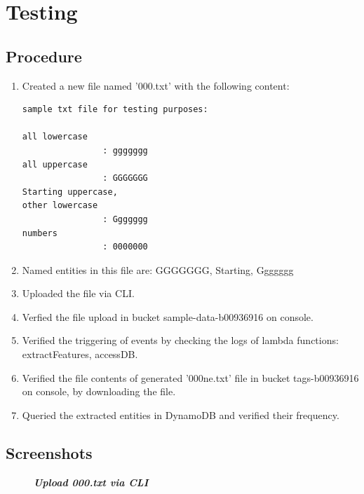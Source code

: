 \newpage
\section{Testing}
\subsection{Procedure}
\begin{enumerate}
    \item Created a new file named '000.txt' with the following content:
  \begin{mdframed}[linewidth=1pt]
\begin{verbatim}
sample txt file for testing purposes:

all lowercase   
                : ggggggg
all uppercase   
                : GGGGGGG
Starting uppercase, 
other lowercase 
                : Ggggggg
numbers         
                : 0000000
\end{verbatim}
\end{mdframed}

    \item Named entities in this file are: GGGGGGG, Starting, Ggggggg
    \item Uploaded the file via CLI.
    \item Verfied the file upload in bucket sample-data-b00936916 on console.
    \item Verified the triggering of events by checking the logs of lambda functions: extractFeatures, accessDB.
    \item Verified the file contents of generated '000ne.txt' file in bucket tags-b00936916 on console, by downloading the file.
    \item Queried the extracted entities in DynamoDB and verified their frequency.
\end{enumerate}

\newpage
\subsection{Screenshots}

\begin{figure}[htp]
    \centering
    \caption{\textbf{\textit{Upload 000.txt via CLI}}}
    \label{fig:}
\end{figure}

